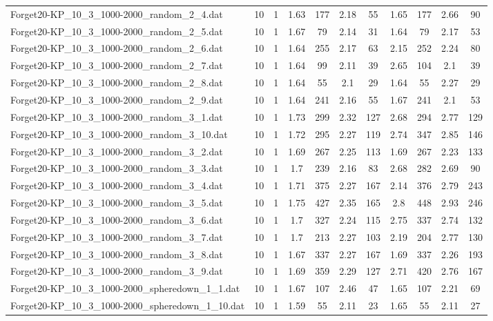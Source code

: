 \begin{table}[!ht]
\begin{tabular}{lcccccccccc}
Forget20-KP\_10\_3\_1000-2000\_random\_2\_4.dat & 10 & 1 & 1.63 & 177 & 2.18 & 55 & 1.65 & 177 & 2.66 & 90 \\
Forget20-KP\_10\_3\_1000-2000\_random\_2\_5.dat & 10 & 1 & 1.67 & 79 & 2.14 & 31 & 1.64 & 79 & 2.17 & 53 \\
Forget20-KP\_10\_3\_1000-2000\_random\_2\_6.dat & 10 & 1 & 1.64 & 255 & 2.17 & 63 & 2.15 & 252 & 2.24 & 80 \\
Forget20-KP\_10\_3\_1000-2000\_random\_2\_7.dat & 10 & 1 & 1.64 & 99 & 2.11 & 39 & 2.65 & 104 & 2.1 & 39 \\
Forget20-KP\_10\_3\_1000-2000\_random\_2\_8.dat & 10 & 1 & 1.64 & 55 & 2.1 & 29 & 1.64 & 55 & 2.27 & 29 \\
Forget20-KP\_10\_3\_1000-2000\_random\_2\_9.dat & 10 & 1 & 1.64 & 241 & 2.16 & 55 & 1.67 & 241 & 2.1 & 53 \\
Forget20-KP\_10\_3\_1000-2000\_random\_3\_1.dat & 10 & 1 & 1.73 & 299 & 2.32 & 127 & 2.68 & 294 & 2.77 & 129 \\
Forget20-KP\_10\_3\_1000-2000\_random\_3\_10.dat & 10 & 1 & 1.72 & 295 & 2.27 & 119 & 2.74 & 347 & 2.85 & 146 \\
Forget20-KP\_10\_3\_1000-2000\_random\_3\_2.dat & 10 & 1 & 1.69 & 267 & 2.25 & 113 & 1.69 & 267 & 2.23 & 133 \\
Forget20-KP\_10\_3\_1000-2000\_random\_3\_3.dat & 10 & 1 & 1.7 & 239 & 2.16 & 83 & 2.68 & 282 & 2.69 & 90 \\
Forget20-KP\_10\_3\_1000-2000\_random\_3\_4.dat & 10 & 1 & 1.71 & 375 & 2.27 & 167 & 2.14 & 376 & 2.79 & 243 \\
Forget20-KP\_10\_3\_1000-2000\_random\_3\_5.dat & 10 & 1 & 1.75 & 427 & 2.35 & 165 & 2.8 & 448 & 2.93 & 246 \\
Forget20-KP\_10\_3\_1000-2000\_random\_3\_6.dat & 10 & 1 & 1.7 & 327 & 2.24 & 115 & 2.75 & 337 & 2.74 & 132 \\
Forget20-KP\_10\_3\_1000-2000\_random\_3\_7.dat & 10 & 1 & 1.7 & 213 & 2.27 & 103 & 2.19 & 204 & 2.77 & 130 \\
Forget20-KP\_10\_3\_1000-2000\_random\_3\_8.dat & 10 & 1 & 1.67 & 337 & 2.27 & 167 & 1.69 & 337 & 2.26 & 193 \\
Forget20-KP\_10\_3\_1000-2000\_random\_3\_9.dat & 10 & 1 & 1.69 & 359 & 2.29 & 127 & 2.71 & 420 & 2.76 & 167 \\
Forget20-KP\_10\_3\_1000-2000\_spheredown\_1\_1.dat & 10 & 1 & 1.67 & 107 & 2.46 & 47 & 1.65 & 107 & 2.21 & 69 \\
Forget20-KP\_10\_3\_1000-2000\_spheredown\_1\_10.dat & 10 & 1 & 1.59 & 55 & 2.11 & 23 & 1.65 & 55 & 2.11 & 27 \\

\end{tabular}
\end{table}
